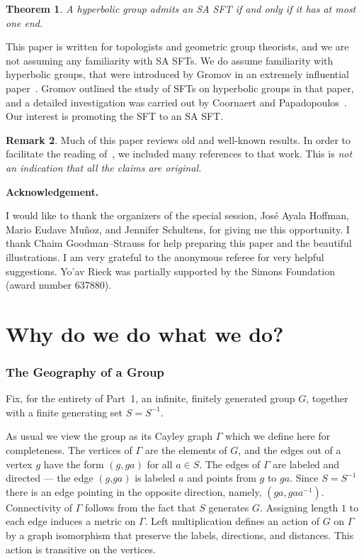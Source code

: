 \documentclass[12pt,reqno]{amsart}
\theoremstyle{plain}
\theoremstyle{definition}
\numberwithin{subcase}{case}
\theoremstyle{plain}
\newtheorem{thm}{Theorem}
\theoremstyle{definition}
\newtheorem{remark}[thm]{Remark}
\begin{document}
\begin{thm}
\label{MainThm}
A hyperbolic group admits an SA SFT if and only if it has at most one end.     
\end{thm}

\noindent
This paper is written for topologists and geometric group theorists, and we are not assuming any familiarity with SA SFTs.  We do assume familiarity with hyperbolic groups, that were introduced by Gromov in an extremely influential paper~\cite{gromov}. Gromov outlined the study of SFTs on hyperbolic groups in that paper, and a detailed investigation was carried out by Coornaert and Papadopoulos~\cite{MR1222644,MR1878587}. Our interest is promoting the SFT to an SA SFT.

\begin{remark}
Much of this paper reviews old and well-known results. In order to facilitate the reading of~\cite{cohen_goodman-strauss_rieck_2021}, we included many references to that work. This is \em not \em an indication that all the claims are original. 
\end{remark}

{\bf Acknowledgement.} 


I would like to thank the organizers of the special session, Jos\'e Ayala Hoffman, Mario Eudave Mu\~noz, and Jennifer Schultens, for giving me this opportunity. I thank Chaim Goodman--Strauss for help preparing this paper and the beautiful illustrations.  
I am very grateful to the anonymous referee for very helpful suggestions.
Yo'av Rieck was partially supported by the Simons Foundation (award number 637880).


\part{Why do we do what we do?}\label{part:why}

\section{The Geography of a Group}



Fix, for the entirety of Part~1, an infinite, finitely generated group \(G\), together with a finite generating set \(S = S^{-1}\). 

As usual we view the group as its Cayley graph \(\Gamma\) which we define here for completeness.  The vertices of \(\Gamma\) are the elements of \(G\), and the edges out of a vertex \(g\) have the form \((\textit{g},\textit{ga})\) for all \(\textit{a} \in S\). The edges of \(\Gamma\) are labeled and directed --- the edge \((\textit{g,ga})\) is labeled \(a\) and points from \(g\) to \(\textit{ga}\). Since \(S = S^{-1}\) there is an edge pointing in the opposite direction, namely, \((\textit{ga},\textit{gaa}^{-1})\).  Connectivity of \(\Gamma\) follows from the fact that \(S\) generates \(G\). Assigning length \(1\) to each edge induces a metric on \(\Gamma\). Left multiplication defines an action of \(G\) on \(\Gamma\) by a graph isomorphism that preserve the labels, directions, and distances. This action is transitive on the vertices.
\end{document}
